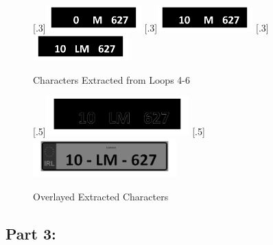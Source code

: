 \documentclass[a4paper]{article}
\begin{document}
	\begin{figure}[H]
		\centering
		[.3\linewidth]{\includegraphics[height=1cm]{Results/Q2/NumPlate6/qanumber_plate_6Added4.jpg}}%
		[.3\linewidth]{\includegraphics[height=1cm]{Results/Q2/NumPlate6/qanumber_plate_6Added5.jpg}}%
		[.3\linewidth]{\includegraphics[height=1cm]{Results/Q2/NumPlate6/qanumber_plate_6Added6.jpg}}%
		\caption{Characters Extracted from Loops 4-6}
		\label{fig:}
	\end{figure}
	\begin{figure}[H]
		\centering
		[.5\linewidth]{\includegraphics[height=1.5cm]{Results/Q2/NumPlate6/qanumber_plate_6Canny.jpg}}%
		[.5\linewidth]{\includegraphics[height=1.5cm]{Results/Q2/NumPlate6/qanumber_plate_6Overlay.jpg}}%
		\caption{Overlayed Extracted Characters}
		\label{fig:}
	\end{figure}
	\subsection{Part 3:}
\end{document}
